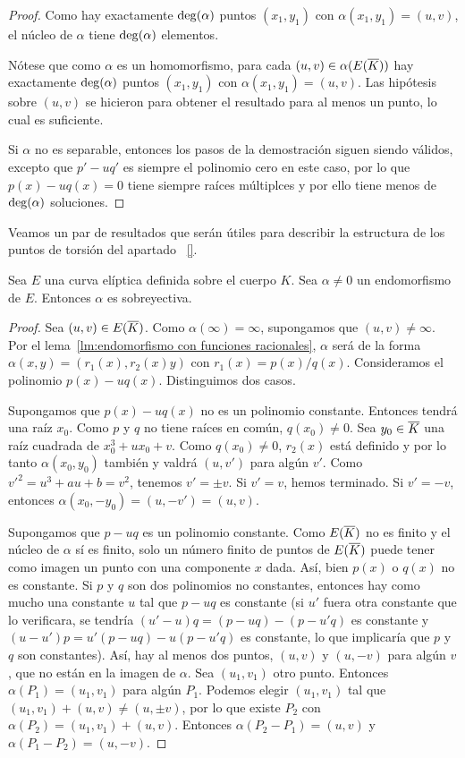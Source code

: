 \begin{proof}
	Como hay exactamente $\deg(\alpha)$ puntos $(x_1, y_1)$ con $\alpha(x_1, y_1) = (u, v)$, el núcleo de $\alpha$ tiene $\deg(\alpha)$ elementos.

	Nótese que como $\alpha$ es un homomorfismo, para cada $(u, v) \in \alpha(E(\overline{K}))$ hay exactamente $\deg(\alpha)$ puntos $(x_1, y_1)$ con $\alpha(x_1, y_1) = (u, v)$. Las hipótesis sobre $(u, v)$ se hicieron para obtener el resultado para al menos un punto, lo cual es suficiente.

	Si $\alpha$ no es separable, entonces los pasos de la demostración siguen siendo válidos, excepto que $p' - u q'$ es siempre el polinomio cero en este caso, por lo que $p(x) - u q(x) = 0$ tiene siempre raíces múltiplces y por ello tiene menos de $\deg(\alpha)$ soluciones.
\end{proof}

Veamos un par de resultados que serán útiles para describir la estructura de los puntos de torsión del apartado ~\ref{}.

\begin{proposicion}\label{pp:sobreyectividad endomorfismos}
	Sea $E$ una curva elíptica definida sobre el cuerpo $K$. Sea $\alpha \neq 0$ un endomorfismo de $E$. Entonces $\alpha$ es sobreyectiva.
\end{proposicion}
\begin{proof}
Sea $(u, v) \in E(\overline{K})$. Como $\alpha(\infty) = \infty$, supongamos que $(u, v) \neq \infty$. Por el lema~\ref{lm:endomorfismo con funciones racionales}, $\alpha$ será de la forma $\alpha(x, y) = (r_1(x), r_2(x) y)$ con $r_1(x) = p(x) / q(x)$. Consideramos el polinomio $p(x) - u q(x)$. Distinguimos dos casos.

Supongamos que $p(x) - u q(x)$ no es un polinomio constante. Entonces tendrá una raíz $x_0$. Como $p$ y $q$ no tiene raíces en común, $q(x_0) \neq 0$. Sea $y_0 \in \overline{K}$ una raíz cuadrada de $x_0^3 + u x_0 + v$. Como $q(x_0) \neq 0$, $r_2(x)$ está definido y por lo tanto $\alpha(x_0, y_0)$ también y valdrá $(u, v')$ para algún $v'$. Como $v'^2 = u^3 + a u + b = v^2$, tenemos $v' = \pm v$. Si $v' = v$, hemos terminado. Si $v' = -v$, entonces $\alpha(x_0, -y_0) = (u, -v') = (u, v)$.

Supongamos que $p - uq$ es un polinomio constante. Como $E(\overline{K})$ no es finito y el núcleo de $\alpha$ sí es finito, solo un número finito de puntos de $E(\overline{K})$ puede tener como imagen un punto con una componente $x$ dada. Así, bien $p(x)$ o $q(x)$ no es constante. Si $p$ y $q$ son dos polinomios no constantes, entonces hay como mucho una constante $u$ tal que $p - uq$ es constante (si $u'$ fuera otra constante que lo verificara, se tendría $(u' - u)q = (p - u q) - (p - u' q)$ es constante y $(u - u') p = u' (p - u q) - u (p - u' q)$ es constante, lo que implicaría que $p$ y $q$ son constantes). Así, hay al menos dos puntos, $(u, v)$ y $(u, -v)$ para algún $v$, que no están en la imagen de $\alpha$. Sea $(u_1, v_1)$ otro punto. Entonces $\alpha(P_1) = (u_1, v_1)$ para algún $P_1$. Podemos elegir $(u_1, v_1)$ tal que $(u_1, v_1) + (u, v) \neq (u, \pm v)$, por lo que existe $P_2$ con $\alpha(P_2) = (u_1, v_1) + (u, v)$. Entonces $\alpha(P_2 - P_1) = (u, v)$ y $\alpha(P_1 - P_2) = (u, -v)$.

\end{proof}

